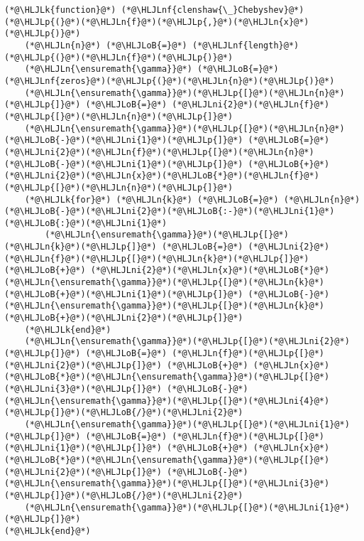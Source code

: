 \documentclass[12pt,landscape]{article}
\newcommand{\HLJLk}[1]{\textcolor[RGB]{148,91,176}{\textbf{#1}}}
\newcommand{\HLJLn}[1]{#1}
\newcommand{\HLJLnf}[1]{\textcolor[RGB]{66,102,213}{#1}}
\newcommand{\HLJLni}[1]{\textcolor[RGB]{59,151,46}{#1}}
\newcommand{\HLJLoB}[1]{\textcolor[RGB]{102,102,102}{\textbf{#1}}}
\newcommand{\HLJLp}[1]{#1}
\begin{document}
{\begin{lstlisting}
(*@\HLJLk{function}@*) (*@\HLJLnf{clenshaw{\_}Chebyshev}@*)(*@\HLJLp{(}@*)(*@\HLJLn{f}@*)(*@\HLJLp{,}@*)(*@\HLJLn{x}@*)(*@\HLJLp{)}@*)
    (*@\HLJLn{n}@*) (*@\HLJLoB{=}@*) (*@\HLJLnf{length}@*)(*@\HLJLp{(}@*)(*@\HLJLn{f}@*)(*@\HLJLp{)}@*)
    (*@\HLJLn{\ensuremath{\gamma}}@*) (*@\HLJLoB{=}@*) (*@\HLJLnf{zeros}@*)(*@\HLJLp{(}@*)(*@\HLJLn{n}@*)(*@\HLJLp{)}@*)
    (*@\HLJLn{\ensuremath{\gamma}}@*)(*@\HLJLp{[}@*)(*@\HLJLn{n}@*)(*@\HLJLp{]}@*) (*@\HLJLoB{=}@*) (*@\HLJLni{2}@*)(*@\HLJLn{f}@*)(*@\HLJLp{[}@*)(*@\HLJLn{n}@*)(*@\HLJLp{]}@*)
    (*@\HLJLn{\ensuremath{\gamma}}@*)(*@\HLJLp{[}@*)(*@\HLJLn{n}@*)(*@\HLJLoB{-}@*)(*@\HLJLni{1}@*)(*@\HLJLp{]}@*) (*@\HLJLoB{=}@*) (*@\HLJLni{2}@*)(*@\HLJLn{f}@*)(*@\HLJLp{[}@*)(*@\HLJLn{n}@*)(*@\HLJLoB{-}@*)(*@\HLJLni{1}@*)(*@\HLJLp{]}@*) (*@\HLJLoB{+}@*)(*@\HLJLni{2}@*)(*@\HLJLn{x}@*)(*@\HLJLoB{*}@*)(*@\HLJLn{f}@*)(*@\HLJLp{[}@*)(*@\HLJLn{n}@*)(*@\HLJLp{]}@*)
    (*@\HLJLk{for}@*) (*@\HLJLn{k}@*) (*@\HLJLoB{=}@*) (*@\HLJLn{n}@*)(*@\HLJLoB{-}@*)(*@\HLJLni{2}@*)(*@\HLJLoB{:-}@*)(*@\HLJLni{1}@*)(*@\HLJLoB{:}@*)(*@\HLJLni{1}@*)
        (*@\HLJLn{\ensuremath{\gamma}}@*)(*@\HLJLp{[}@*)(*@\HLJLn{k}@*)(*@\HLJLp{]}@*) (*@\HLJLoB{=}@*) (*@\HLJLni{2}@*)(*@\HLJLn{f}@*)(*@\HLJLp{[}@*)(*@\HLJLn{k}@*)(*@\HLJLp{]}@*) (*@\HLJLoB{+}@*) (*@\HLJLni{2}@*)(*@\HLJLn{x}@*)(*@\HLJLoB{*}@*)(*@\HLJLn{\ensuremath{\gamma}}@*)(*@\HLJLp{[}@*)(*@\HLJLn{k}@*)(*@\HLJLoB{+}@*)(*@\HLJLni{1}@*)(*@\HLJLp{]}@*) (*@\HLJLoB{-}@*) (*@\HLJLn{\ensuremath{\gamma}}@*)(*@\HLJLp{[}@*)(*@\HLJLn{k}@*)(*@\HLJLoB{+}@*)(*@\HLJLni{2}@*)(*@\HLJLp{]}@*)
    (*@\HLJLk{end}@*)
    (*@\HLJLn{\ensuremath{\gamma}}@*)(*@\HLJLp{[}@*)(*@\HLJLni{2}@*)(*@\HLJLp{]}@*) (*@\HLJLoB{=}@*) (*@\HLJLn{f}@*)(*@\HLJLp{[}@*)(*@\HLJLni{2}@*)(*@\HLJLp{]}@*) (*@\HLJLoB{+}@*) (*@\HLJLn{x}@*)(*@\HLJLoB{*}@*)(*@\HLJLn{\ensuremath{\gamma}}@*)(*@\HLJLp{[}@*)(*@\HLJLni{3}@*)(*@\HLJLp{]}@*) (*@\HLJLoB{-}@*) (*@\HLJLn{\ensuremath{\gamma}}@*)(*@\HLJLp{[}@*)(*@\HLJLni{4}@*)(*@\HLJLp{]}@*)(*@\HLJLoB{/}@*)(*@\HLJLni{2}@*)
    (*@\HLJLn{\ensuremath{\gamma}}@*)(*@\HLJLp{[}@*)(*@\HLJLni{1}@*)(*@\HLJLp{]}@*) (*@\HLJLoB{=}@*) (*@\HLJLn{f}@*)(*@\HLJLp{[}@*)(*@\HLJLni{1}@*)(*@\HLJLp{]}@*) (*@\HLJLoB{+}@*) (*@\HLJLn{x}@*)(*@\HLJLoB{*}@*)(*@\HLJLn{\ensuremath{\gamma}}@*)(*@\HLJLp{[}@*)(*@\HLJLni{2}@*)(*@\HLJLp{]}@*) (*@\HLJLoB{-}@*) (*@\HLJLn{\ensuremath{\gamma}}@*)(*@\HLJLp{[}@*)(*@\HLJLni{3}@*)(*@\HLJLp{]}@*)(*@\HLJLoB{/}@*)(*@\HLJLni{2}@*)
    (*@\HLJLn{\ensuremath{\gamma}}@*)(*@\HLJLp{[}@*)(*@\HLJLni{1}@*)(*@\HLJLp{]}@*)
(*@\HLJLk{end}@*)


\end{lstlisting}}
\end{document}
